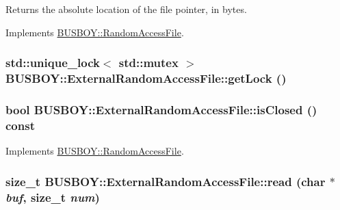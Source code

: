 Returns the absolute location of the file pointer, in bytes. 

Implements \hyperlink{classBUSBOY_1_1RandomAccessFile_a51f73555d719157ab2bb6df166dd0074}{BUSBOY::RandomAccessFile}.\hypertarget{classBUSBOY_1_1ExternalRandomAccessFile_af14518d87afea586cd26e050e7046063}{
\subsubsection[{getLock}]{\setlength{\rightskip}{0pt plus 5cm}std::unique\_\-lock$<$ std::mutex $>$ BUSBOY::ExternalRandomAccessFile::getLock ()}}
\label{classBUSBOY_1_1ExternalRandomAccessFile_af14518d87afea586cd26e050e7046063}
\hypertarget{classBUSBOY_1_1ExternalRandomAccessFile_aabfe65bbe76080f7e551ca2c8ea4123d}{
\subsubsection[{isClosed}]{\setlength{\rightskip}{0pt plus 5cm}bool BUSBOY::ExternalRandomAccessFile::isClosed () const}}
\label{classBUSBOY_1_1ExternalRandomAccessFile_aabfe65bbe76080f7e551ca2c8ea4123d}


Implements \hyperlink{classBUSBOY_1_1RandomAccessFile_ab31acc588485ee4832e96c907fe998fd}{BUSBOY::RandomAccessFile}.\hypertarget{classBUSBOY_1_1ExternalRandomAccessFile_a7dce7dc11ead8487ffba054210e3adcc}{
\subsubsection[{read}]{\setlength{\rightskip}{0pt plus 5cm}size\_\-t BUSBOY::ExternalRandomAccessFile::read (char $\ast$ {\em buf}, \/  size\_\-t {\em num})}}
\label{classBUSBOY_1_1ExternalRandomAccessFile_a7dce7dc11ead8487ffba054210e3adcc}


